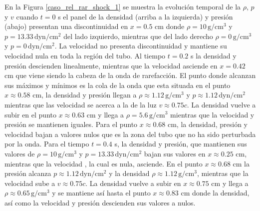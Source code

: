 \documentclass[12pt,a4paper]{book}
\begin{document}
En la Figura \ref{caso_rel_rar_shock_1} se muestra la evolución temporal de la $\rho$, $p$ y $v$
cuando $t = 0$ s el panel de la densidad 
(arriba a la izquierda) 
y presión (abajo) presentan una discontinuidad en $x = 0.5$ cm donde $\rho = 10 \,  \text{g}/ \text{cm}^3$
y $p = 13.33 \,  \text{dyn}/ \text{cm}^2 $ del lado izquierdo, mientras que del lado derecho $\rho = 0  \,  \text{g}/ \text{cm}^3$
y $p = 0 \,  \text{dyn}/ \text{cm}^2 $. La velocidad no presenta discontinuidad y mantiene su 
velocidad nula en toda la región del tubo. 
Al tiempo $t =0.2$ s la densidad y presión 
descienden linealmente, mientras que la velocidad asciende en $x = 0.42$ cm
que viene siendo la cabeza de la onda de rarefacción. El punto donde alcanzan 
sus máximos y mínimos es la cola de la onda que esta situada en el punto $x \approx 0.58$ cm,
la densidad y presión llegan a $\rho \approx 1.12 \,  \text{g}/ \text{cm}^3$ y 
$p \approx 1.12\,  \text{dyn}/ \text{cm}^2 $ mientras que las velocidad
se acerca a la de la luz $v \approx 0.75c$. La densidad vuelve a subir en el punto $x \approx 0.63$ cm
y llega a $\rho = 5.6  \,  \text{g}/ \text{cm}^3$ mientras que la velocidad y presión se mantienen iguales. Para el punto
$x \approx 0.68$ cm, la densidad, presión y velocidad bajan a valores nulos que es la zona del tubo que
no ha sido perturbada por la onda.
Para el tiempo $t = 0.4$ s, la densidad y presión, que mantienen sus valores de 
$\rho = 10 \,  \text{g}/ \text{cm}^3$ y 
$p = 13.33 \,  \text{dyn}/ \text{cm}^2 $ bajan sus valores en $x \approx 0.25$ cm, mientras que la velocidad , la cual es nula,
asciende. En el punto $x \approx 0.68$ cm la presión alcanza $p \approx 1.12\,  \text{dyn}/ \text{cm}^2 $ y la densidad
$\rho \approx 1.12 \,  \text{g}/ \text{cm}^3$, mientras que la velocidad sube a $v \approx 0.75c$. 
La densidad vuelve a subir
en $x \approx 0.75$ cm y llega a $\rho \approx 0.65 \,  \text{g}/ \text{cm}^3$ y 
se mantiene así hasta el punto $x \approx 0.83$ cm
donde la densidad, así como la velocidad y presión descienden sus valores a nulos.
\end{document}
